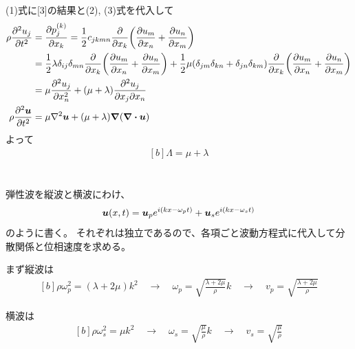 \documentclass[../ap_2021.tex]{subfiles}
\begin{document}
\section{}
(1)式に[3]の結果と(2), (3)式を代入して
\begin{equation}\begin{aligned}[b]
    \rho\pdv[2]{u_j}{t} &= \pdv{p_j^{(k)}}{x_k}=\frac{1}{2}c_{jkmn}\pdv{x_k}\qty(\pdv{u_m}{x_n}+\pdv{u_n}{x_m})\\
    &= \frac{1}{2}\lambda\delta_{ij}\delta_{mn}\pdv{x_k}\qty(\pdv{u_m}{x_n}+\pdv{u_n}{x_m})
    +\frac{1}{2}\mu(\delta_{jm}\delta_{kn}+\delta_{jn}\delta_{km})\pdv{x_k}\qty(\pdv{u_m}{x_n}+\pdv{u_n}{x_m})\\
    &= \mu\pdv[2]{u_j}{x_n}+(\mu+\lambda)\pdv[2]{u_j}{x_j}{x_n}\\
    \rho\pdv[2]{\vb*{u}}{t} &= \mu\laplacian{\vb*{u}}+(\mu+\lambda)\grad(\div{\vb*{u}})
\end{aligned}\end{equation}
よって
\begin{equation}\begin{aligned}[b]
    \Lambda = \mu + \lambda
\end{aligned}\end{equation}

\section{}
弾性波を縦波と横波にわけ、
\begin{equation}\begin{aligned}[b]
    \vb*{u}(x,t)=\vb*{u}_pe^{i(kx-\omega_pt)}+\vb*{u}_se^{i(kx-\omega_s t)}
\end{aligned}\end{equation}
のように書く。
それぞれは独立であるので、各項ごと波動方程式に代入して分散関係と位相速度を求める。


まず縦波は
\begin{equation}\begin{aligned}[b]
    \rho\omega_p^2=(\lambda+2\mu)k^2\quad\rightarrow\quad
    \omega_p = \sqrt{\frac{\lambda+2\mu}{\rho}}k\quad\rightarrow\quad
    v_p = \sqrt{\frac{\lambda+2\mu}{\rho}}
\end{aligned}\end{equation}

横波は
\begin{equation}\begin{aligned}[b]
    \rho\omega_s^2 =\mu k^2 \quad\rightarrow\quad
    \omega_s = \sqrt{\frac{\mu}{\rho}}k \quad\rightarrow\quad
    v_s = \sqrt{\frac{\mu}{\rho}}
\end{aligned}\end{equation}
\end{document}
